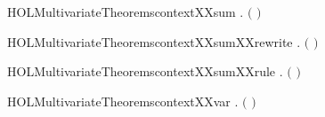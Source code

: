 \begin{SaveVerbatim}{HOLMultivariateTheoremscontextXXsum}
\HOLTokenTurnstile{} \HOLSymConst{\HOLTokenForall{}}  .
         \ensuremath{(} \HOLSymConst{\ensuremath{+}} \ensuremath{)} \HOLSymConst{\HOLTokenImp{}}    \HOLSymConst{\HOLTokenConj{}}   
\end{SaveVerbatim}
\newcommand{\HOLMultivariateTheoremscontextXXsum}{\UseVerbatim{HOLMultivariateTheoremscontextXXsum}}
\begin{SaveVerbatim}{HOLMultivariateTheoremscontextXXsumXXrewrite}
\HOLTokenTurnstile{} \HOLSymConst{\HOLTokenForall{}}  .
         \ensuremath{(} \HOLSymConst{\ensuremath{+}} \ensuremath{)} \HOLSymConst{\HOLTokenEquiv{}}    \HOLSymConst{\HOLTokenConj{}}   
\end{SaveVerbatim}
\newcommand{\HOLMultivariateTheoremscontextXXsumXXrewrite}{\UseVerbatim{HOLMultivariateTheoremscontextXXsumXXrewrite}}
\begin{SaveVerbatim}{HOLMultivariateTheoremscontextXXsumXXrule}
\HOLTokenTurnstile{} \HOLSymConst{\HOLTokenForall{}}  .
          \HOLSymConst{\HOLTokenConj{}}    \HOLSymConst{\HOLTokenImp{}}   \ensuremath{(} \HOLSymConst{\ensuremath{+}} \ensuremath{)}
\end{SaveVerbatim}
\newcommand{\HOLMultivariateTheoremscontextXXsumXXrule}{\UseVerbatim{HOLMultivariateTheoremscontextXXsumXXrule}}
\begin{SaveVerbatim}{HOLMultivariateTheoremscontextXXvar}
\HOLTokenTurnstile{} \HOLSymConst{\HOLTokenForall{}} .   \ensuremath{(} \ensuremath{)}
\end{SaveVerbatim}
